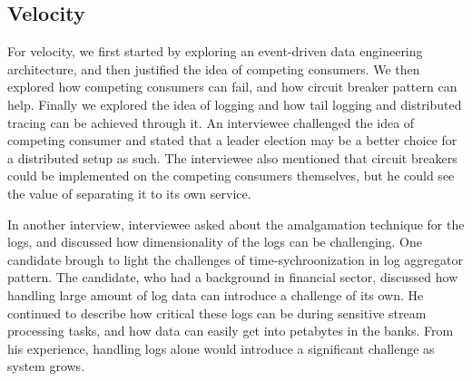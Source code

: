 \documentclass[a4paper,11pt,article,oneside]{memoir}
\begin{document}





\subsection{Velocity}

For velocity, we first started by exploring an event-driven data engineering architecture, and then justified the idea of competing consumers. We then explored how competing consumers can fail, and how circuit breaker pattern can help. Finally we explored the idea of logging and how tail logging and distributed tracing can be achieved through it. An interviewee challenged the idea of competing consumer and stated that a leader election may be a better choice for a distributed setup as such. The interviewee also mentioned that circuit breakers could be implemented on the competing consumers themselves, but he could see the value of separating it to its own service.  

In another interview, interviewee asked about the amalgamation technique for the logs, and discussed how dimensionality of the logs can be challenging. One candidate brough to light the challenges of time-sychroonization in log aggregator pattern. The candidate, who had a background in financial sector, discussed how handling large amount of log data can introduce a challenge of its own. He continued to describe how critical these logs can be during sensitive stream processing tasks, and how data can easily get into petabytes in the banks. From his experience, handling logs alone would introduce a significant challenge as system grows.
\end{document}
